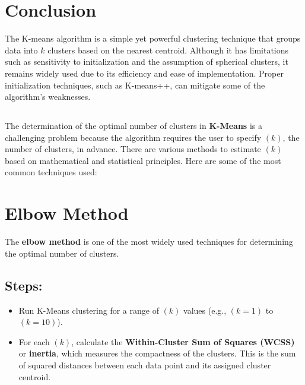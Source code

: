 \documentclass{article}
\begin{document}
\section{Conclusion}

The K-means algorithm is a simple yet powerful clustering technique that groups data into $k$ clusters based on the nearest centroid. Although it has limitations such as sensitivity to initialization and the assumption of spherical clusters, it remains widely used due to its efficiency and ease of implementation. Proper initialization techniques, such as K-means++, can mitigate some of the algorithm's weaknesses.



\newpage

\begin{center}
    \section*{}
\end{center}


The determination of the optimal number of clusters in \textbf{K-Means} is a challenging problem because the algorithm requires the user to specify $( k )$, the number of clusters, in advance. There are various methods to estimate $( k )$ based on mathematical and statistical principles. Here are some of the most common techniques used:

\section*{ Elbow Method}

The \textbf{elbow method} is one of the most widely used techniques for determining the optimal number of clusters.

\subsection*{ Steps: }
\begin{itemize}
    \item Run K-Means clustering for a range of $( k )$ values (e.g., $( k = 1 )$ to $( k = 10 )$).
    \item For each $( k )$, calculate the \textbf{Within-Cluster Sum of Squares (WCSS)} or \textbf{inertia}, which measures the compactness of the clusters. This is the sum of squared distances between each data point and its assigned cluster centroid.
\end{itemize}
\end{document}
